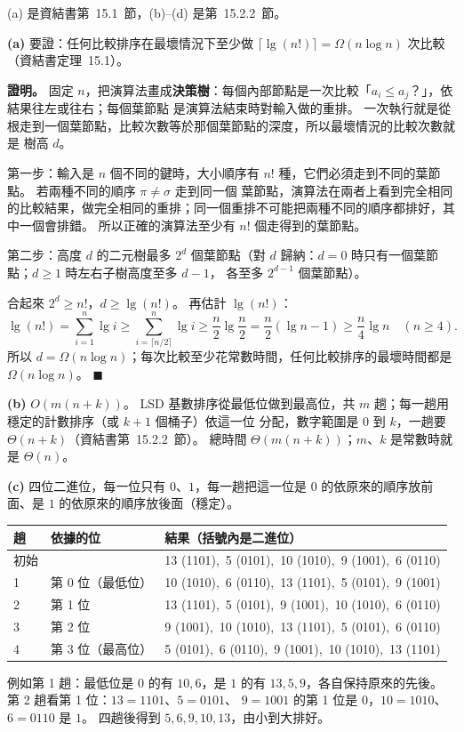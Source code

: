 \begin{pastsoln}
(a) 是資結書第~15.1~節，(b)--(d) 是第~15.2.2~節。

\textbf{(a)} 要證：任何比較排序在最壞情況下至少做 $\lceil \lg(n!) \rceil = \Omega(n \log n)$ 次比較（資結書定理~15.1）。

\textbf{證明。} 固定 $n$，把演算法畫成\textbf{決策樹}：每個內部節點是一次比較「$a_i \le a_j$？」，依結果往左或往右；每個葉節點
是演算法結束時對輸入做的重排。 一次執行就是從根走到一個葉節點，比較次數等於那個葉節點的深度，所以最壞情況的比較次數就是
樹高 $d$。

第一步：輸入是 $n$ 個不同的鍵時，大小順序有 $n!$ 種，它們必須走到不同的葉節點。 若兩種不同的順序 $\pi \ne \sigma$ 走到同一個
葉節點，演算法在兩者上看到完全相同的比較結果，做完全相同的重排；同一個重排不可能把兩種不同的順序都排好，其中一個會排錯。
所以正確的演算法至少有 $n!$ 個走得到的葉節點。

第二步：高度 $d$ 的二元樹最多 $2^d$ 個葉節點（對 $d$ 歸納：$d = 0$ 時只有一個葉節點；$d \ge 1$ 時左右子樹高度至多 $d - 1$，
各至多 $2^{d-1}$ 個葉節點）。

合起來 $2^d \ge n!$，$d \ge \lg(n!)$。 再估計 $\lg(n!)$：
\[
\lg(n!) = \sum_{i=1}^{n} \lg i \ge \sum_{i=\lceil n/2 \rceil}^{n} \lg i \ge \frac{n}{2} \lg \frac{n}{2} = \frac{n}{2}(\lg n - 1)
\ge \frac{n}{4} \lg n \quad (n \ge 4).
\]
所以 $d = \Omega(n \log n)$；每次比較至少花常數時間，任何比較排序的最壞時間都是 $\Omega(n \log n)$。
\hfill$\blacksquare$

\textbf{(b)} $O(m(n + k))$。 LSD 基數排序從最低位做到最高位，共 $m$ 趟；每一趟用穩定的計數排序（或 $k + 1$ 個桶子）依這一位
分配，數字範圍是 $0$ 到 $k$，一趟要 $\Theta(n + k)$（資結書第~15.2.2~節）。 總時間 $\Theta(m(n + k))$；$m$、$k$ 是常數時就是
$\Theta(n)$。

\textbf{(c)} 四位二進位，每一位只有 $0$、$1$，每一趟把這一位是 $0$ 的依原來的順序放前面、是 $1$ 的依原來的順序放後面（穩定）。
\begin{center}
\small
\begin{tabular}{lll}
\toprule
趟 & 依據的位 & 結果（括號內是二進位） \\
\midrule
初始 & & 13 (1101),\ 5 (0101),\ 10 (1010),\ 9 (1001),\ 6 (0110) \\
1 & 第 0 位（最低位） & 10 (1010),\ 6 (0110),\ 13 (1101),\ 5 (0101),\ 9 (1001) \\
2 & 第 1 位 & 13 (1101),\ 5 (0101),\ 9 (1001),\ 10 (1010),\ 6 (0110) \\
3 & 第 2 位 & 9 (1001),\ 10 (1010),\ 13 (1101),\ 5 (0101),\ 6 (0110) \\
4 & 第 3 位（最高位） & 5 (0101),\ 6 (0110),\ 9 (1001),\ 10 (1010),\ 13 (1101) \\
\bottomrule
\end{tabular}
\end{center}
例如第 1 趟：最低位是 $0$ 的有 $10, 6$，是 $1$ 的有 $13, 5, 9$，各自保持原來的先後。 第 2 趟看第 1 位：$13 = 1101$、$5 = 0101$、
$9 = 1001$ 的第 1 位是 $0$，$10 = 1010$、$6 = 0110$ 是 $1$。 四趟後得到 $5, 6, 9, 10, 13$，由小到大排好。


\end{pastsoln}

